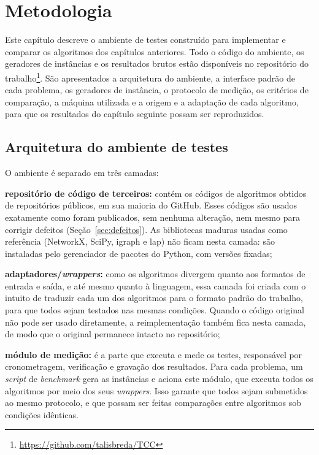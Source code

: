 
\chapter{Metodologia}
\label{cap:metodologia}

Este capítulo descreve o ambiente de testes construído para implementar e comparar os algoritmos dos capítulos anteriores. Todo o código do ambiente, os geradores de instâncias e os resultados brutos estão disponíveis no repositório do trabalho\footnote{\url{https://github.com/talisbreda/TCC}}. São apresentados a arquitetura do ambiente, a interface padrão de cada problema, os geradores de instância, o protocolo de medição, os critérios de comparação, a máquina utilizada e a origem e a adaptação de cada algoritmo, para que os resultados do capítulo seguinte possam ser reproduzidos.

\section{Arquitetura do ambiente de testes}
\label{sec:arquitetura}

O ambiente é separado em três camadas:
\begin{alineas}
    \item \textbf{repositório de código de terceiros:} contém os códigos de algoritmos obtidos de repositórios públicos, em sua maioria do GitHub. Esses códigos são usados exatamente como foram publicados, sem nenhuma alteração, nem mesmo para corrigir defeitos (Seção~\ref{sec:defeitos}). As bibliotecas maduras usadas como referência (NetworkX, SciPy, igraph e lap) não ficam nesta camada: são instaladas pelo gerenciador de pacotes do Python, com versões fixadas;
    \item \textbf{adaptadores/\textit{wrappers}:} como os algoritmos divergem quanto aos formatos de entrada e saída, e até mesmo quanto à linguagem, essa camada foi criada com o intuito de traduzir cada um dos algoritmos para o formato padrão do trabalho, para que todos sejam testados nas mesmas condições. Quando o código original não pode ser usado diretamente, a reimplementação também fica nesta camada, de modo que o original permanece intacto no repositório;
    \item \textbf{módulo de medição:} é a parte que executa e mede os testes, responsável por cronometragem, verificação e gravação dos resultados. Para cada problema, um \textit{script} de \textit{benchmark} gera as instâncias e aciona este módulo, que executa todos os algoritmos por meio dos seus \textit{wrappers}. Isso garante que todos sejam submetidos ao mesmo protocolo, e que possam ser feitas comparações entre algoritmos sob condições idênticas.
\end{alineas}

